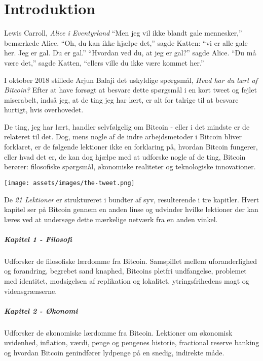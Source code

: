 \chapter*{Introduktion}
\label{ch:introduktion}

\begin{chapquote}{Lewis Carroll, \textit{Alice i Eventyrland}}
\enquote{Men jeg vil ikke blandt gale mennesker,} bemærkede Alice. 
\enquote{Oh, du kan ikke hjælpe det,} sagde Katten: \enquote{vi er alle gale 
her. Jeg er gal. Du er gal.} \enquote{Hvordan ved du, at jeg er gal?} sagde 
Alice. \enquote{Du må være det,} sagde Katten, \enquote{ellers ville du ikke
være kommet her.}
\end{chapquote}

I oktober 2018 stillede Arjun Balaji det uskyldige spørgsmål,
\textit{Hvad har du lært af Bitcoin?} Efter at have forsøgt at besvare dette
spørgsmål i en kort tweet og fejlet miserabelt, indså jeg, at de ting
jeg har lært, er alt for talrige til at besvare hurtigt, hvis overhovedet.

De ting, jeg har lært, handler selvfølgelig om Bitcoin - eller i det mindste 
er de relateret til det. Dog, mens nogle af de indre arbejdsmetoder i Bitcoin 
bliver forklaret, er de følgende lektioner ikke en forklaring på, hvordan 
Bitcoin fungerer, eller hvad det er, de kan dog hjælpe med at udforske nogle 
af de ting, Bitcoin berører: filosofiske spørgsmål, økonomiske realiteter og 
teknologiske innovationer.

\begin{center}
  \texttt{[image: assets/images/the-tweet.png]}
\end{center}

De \textit{21 Lektioner} er struktureret i bundter af syv, resulterende i tre
kapitler. Hvert kapitel ser på Bitcoin gennem en anden linse og udvinder
hvilke lektioner der kan læres ved at undersøge dette mærkelige netværk fra en 
anden vinkel.

\paragraph{Kapitel 1 - Filosofi} 
Udforsker de filosofiske lærdomme fra Bitcoin. Samspillet mellem 
uforanderlighed og forandring, begrebet sand knaphed, Bitcoins pletfri 
undfangelse, problemet med identitet, modsigelsen af replikation og lokalitet, 
ytringsfrihedens magt og vidensgrænserne.

\paragraph{Kapitel 2 - Økonomi} 
Udforsker de økonomiske lærdomme fra Bitcoin. Lektioner om økonomisk uvidenhed, 
inflation, værdi, penge og pengenes historie, fractional reserve banking og 
hvordan Bitcoin genindfører lydpenge på en snedig, indirekte måde.

